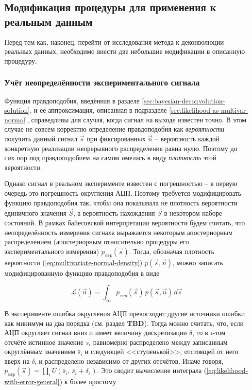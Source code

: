 \documentclass[12pt]{book}
\begin{document}
	\subsection{Модификация процедуры для применения к реальным данным}
	
	Перед тем как, наконец, перейти от исследования метода к деконволюции реальных данных, необходимо внести две небольшие модификации в описанную процедуру.
	
	\subsubsection{Учёт неопределённости экспериментального сигнала}
	
	Функция правдоподобия, введённая в разделе \ref{sec:bayesian-deconvolution-solution}, и её аппроксимация, описанная в подразделе \ref{sec:likelihood-as-multivar-normal}, справедливы для случая, когда сигнал на выходе известен точно. В этом случае не совсем корректно определение правдоподобия как \textit{вероятности} получить данный сигнал $\vec{s}$ при фиксированных $\vec{n}$ -- вероятность каждой конкретную реализации непрерывного распределения равна нулю. Поэтому до сих пор под правдоподобием на самом имелась в виду \textit{плотность} этой вероятности.
	
	Однако сигнал в реальном эксперименте известен с погрешностью -- в первую очередь это погрешность округления АЦП. Поэтому требуется модифицировать функцию правдоподобия так, чтобы она показывала не плотность вероятности единичного значения $\vec{S}$, а вероятность нахождения $\vec{S}$ в некотором наборе состояний. В рамках байесовской интерпретации вероятности будем считать, что неопределённость измерения сигнала выражается некоторым апостериорным распределением (апостериорным относительно процедуры его экспериментального измерения) $p_{exp}(\vec{s})$. Тогда, обозначая плотность вероятности (\ref{eq:multivariate-normal-density}) $p(\vec{s}, \vec{n})$, можно записать модифицированную функцию правдоподобия в виде
	
	\begin{equation}
		\label{eq:likelihood-with-error-general}
		\mathcal{L}(\vec{n}) = \int_{\infty} p_{exp}(\vec{s}) \, p(\vec{s}, \vec{n}) \, d\vec{s}
	\end{equation}

	В эксперименте ошибка округления АЦП превосходит другие источники ошибки как минимум на два порядка (см. раздел \textbf{TBD}). Тогда можно считать, что, если АЦП округляет сигнал вниз и имеет величину дискретизации $\delta$, то в $i$-том отсчёте истинное значение $s_i$ равномерно распределено между записанным округлённым значением $\bar{s}_i$ и следующей <<ступенькой>>, отстоящей от него вверх на $\delta$, и распределено независимо от других отсчётов. Иначе говоря, $p_{exp}(\vec{s}) = \prod_{i} U( \bar{s}_i, \, \bar{s}_i + \delta_s )$. Это сводит вычисление интеграла (\ref{eq:likelihood-with-error-general}) к более простому
	
\end{document}
